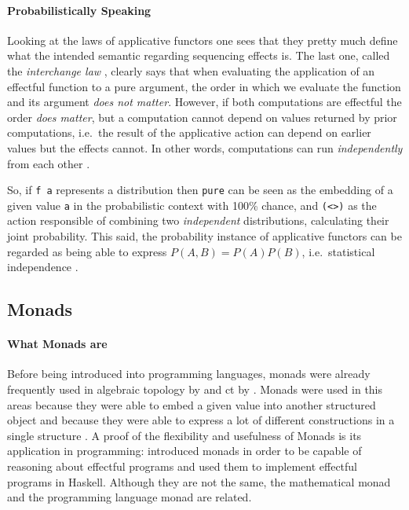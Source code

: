 \documentclass[
  oneside,
  11pt, a4paper,
  footinclude=true,
  headinclude=true,
  cleardoublepage=empty
]{scrbook}
\theoremstyle{definition}
\theoremstyle{definition}
\begin{document}
         \paragraph{Probabilistically Speaking}
	            
	Looking at the laws of applicative functors one sees that they pretty much define what the intended semantic regarding sequencing effects is. The last one, called the \emph{interchange law} \citep{mcbride2008applicative}, clearly says that when evaluating the application of an effectful function to a pure argument, the order in which we evaluate the function and its argument \emph{does not matter}. However, if both computations are effectful the order \emph{does matter}, but a computation cannot depend on values returned by prior computations, i.e.\ the result of the applicative action can depend on earlier values but the effects cannot. In other words, computations can run \emph{independently} from each other \citep{Cooper:2008:EFA:1485346.1485361, Marlow:2014:NFA:2692915.2628144, Marlow:2016:DHD:3241625.2976007, andrey2019selective}.
	            
	So, if \texttt{f a} represents a distribution then \texttt{pure} can be seen as the embedding of a given value \texttt{a} in the probabilistic context with 100\% chance, and \texttt{(\textless*\textgreater)} as the action responsible of combining two \emph{independent} distributions, calculating their joint probability. This said, the probability instance of applicative functors can be regarded as being able to express $P(A, B) = P(A)P(B)$, i.e.\ statistical independence \citep{jtobin}.
	    
	    \subsection{Monads}
	    
	        \paragraph{What Monads are}
	        
	 Before being introduced into programming languages, monads were already frequently used in algebraic topology by \cite{godement1958topologie} and \gls{ct} by \cite{maclane:71}. Monads were used in this areas because they were able to embed a given value into another structured object and because they were able to express a lot of different constructions in a single structure \citep{DBLP:journals/corr/abs-1803-10195}. A proof of the flexibility and usefulness of Monads is its application in programming: \cite{Moggi:1991:NCM:116981.116984} introduced monads in order to be capable of reasoning about effectful programs and \cite{1995_wadler_monads} used them to implement effectful programs in Haskell. Although they are not the same, the mathematical monad and the programming language monad are related.
	            
\end{document}
